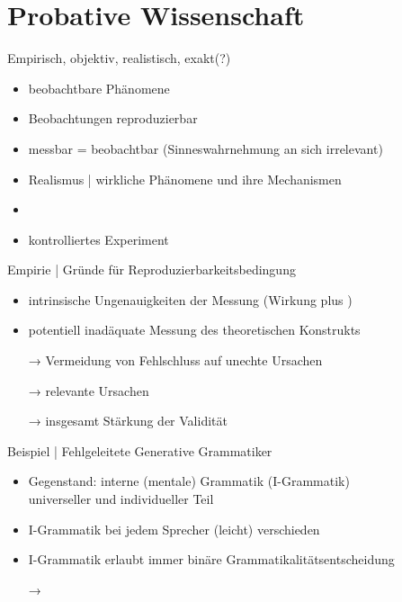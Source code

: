 
\section{Probative Wissenschaft}

\begin{frame}
  {Empirisch, objektiv, realistisch, exakt(?)}
  \begin{itemize}[<+->]
    \item \alert{beobachtbare} Phänomene
    \item Beobachtungen \alert{reproduzierbar}
    \item messbar = beobachtbar (Sinneswahrnehmung an sich irrelevant)
      \Zeile
    \item \alert{Realismus} | wirkliche Phänomene und ihre Mechanismen
    \item {}
      \Zeile
    \item \alert{kontrolliertes Experiment}
  \end{itemize}
\end{frame}

\begin{frame}
  {Empirie | Gründe für Reproduzierbarkeitsbedingung}
  \begin{itemize}[<+->]
    \item intrinsische Ungenauigkeiten der Messung (\alert{Wirkung} plus )
    \item potentiell inadäquate Messung des theoretischen Konstrukts
      \Halbzeile
    \item[→] Vermeidung von Fehlschluss auf unechte Ursachen
    \item[→] \alert{relevante Ursachen}
      \Halbzeile
    \item[→] insgesamt \alert{Stärkung der Validität}
  \end{itemize}
\end{frame}

\begin{frame}
  {Beispiel | Fehlgeleitete Generative Grammatiker}
  \begin{itemize}[<+->]
    \item Gegenstand: interne (mentale) Grammatik (I-Grammatik)\\
      universeller und individueller Teil
    \item I-Grammatik bei jedem Sprecher (leicht) verschieden
    \item I-Grammatik erlaubt immer binäre Grammatikalitätsentscheidung
      \Halbzeile
    \item[→] 
  \end{itemize}
  \Zeile
  \onslide<+->
  \centering 
\end{frame}


